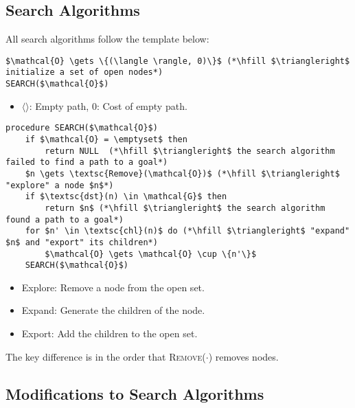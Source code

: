 \subsection{Search Algorithms}
\begin{algo}
    All search algorithms follow the template below:

\begin{lstlisting}
$\mathcal{O} \gets \{(\langle \rangle, 0)\}$ (*\hfill $\triangleright$ initialize a set of open nodes*) 
SEARCH($\mathcal{O}$)
\end{lstlisting}
\begin{itemize}
    \item $\langle \rangle$: Empty path, $0$: Cost of empty path.
\end{itemize}

\begin{lstlisting}
procedure SEARCH($\mathcal{O}$)
    if $\mathcal{O} = \emptyset$ then
        return NULL  (*\hfill $\triangleright$ the search algorithm failed to find a path to a goal*)
    $n \gets \textsc{Remove}(\mathcal{O})$ (*\hfill $\triangleright$ "explore" a node $n$*)
    if $\textsc{dst}(n) \in \mathcal{G}$ then
        return $n$ (*\hfill $\triangleright$ the search algorithm found a path to a goal*)
    for $n' \in \textsc{chl}(n)$ do (*\hfill $\triangleright$ "expand" $n$ and "export" its children*)
        $\mathcal{O} \gets \mathcal{O} \cup \{n'\}$ 
    SEARCH($\mathcal{O}$)
\end{lstlisting}
\begin{itemize}
    \item Explore: Remove a node from the open set.
    \item Expand: Generate the children of the node.
    \item Export: Add the children to the open set.
\end{itemize}

\end{algo}

\begin{warning}
    The key difference is in the order that \textsc{Remove}($\cdot$) removes nodes.
\end{warning}

\subsection{Modifications to Search Algorithms}
